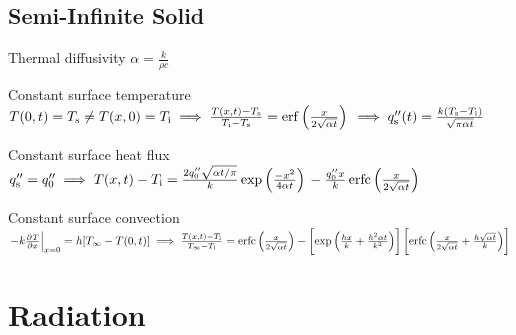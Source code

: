 \documentclass{article}
\begin{document}
\begin{multicols}{2}
\subsection{Semi-Infinite Solid}
\begin{description*}
  \item[Thermal diffusivity]
    \(\alpha = \frac{k}{\rho c}\)
  \item[Constant surface temperature]~\\
    \(T(0,t) = T_{\mathrm{s}} \neq T(x,0) = T_{\mathrm{i}} \\
    \implies \frac{T(x,t)-T_{\mathrm{s}}}{T_{\mathrm{i}}-T_{\mathrm{s}}}
    = \operatorname{erf}\left(\frac{x}{2\sqrt{\alpha t}}\right) \\
    \implies q''_{\mathrm{s}}(t) = \frac{k(T_{\mathrm{s}}-T_{\mathrm{i}})}{\sqrt{\pi\alpha t}}\)
  \item[Constant surface heat flux]
    \(q''_{\mathrm{s}} = q''_0 \\
    \implies T(x,t)-T_{\mathrm{i}}
    = \frac{2q''_0\sqrt{\alpha t/\pi}}{k}\exp\left(\frac{-x^2}{4\alpha t}\right) \\
    - \frac{q''_0x}{k}\operatorname{erfc}\left(\frac{x}{2\sqrt{\alpha t}}\right)\)
  \item[Constant surface convection]~\\
    \(\left.-k\pd{T}{x}\right|_{x=0} = h[T_\infty-T(0,t)]
    \implies \frac{T(x,t)-T_\mrm{i}}{T_\infty-T_\mrm{i}} \\
      = \erfc\left(\frac{x}{2\sqrt{\alpha t}}\right)
      - \left[\exp\left(\frac{hx}{k}+\frac{h^2\alpha t}{k^2}\right)\right]
      \left[\erfc\left(\frac{x}{2\sqrt{\alpha t}}+\frac{h\sqrt{\alpha t}}{k}\right)\right]\)
\end{description*}

\end{multicols}

\section{Radiation}
\label{sec:radiation}
\end{document}
